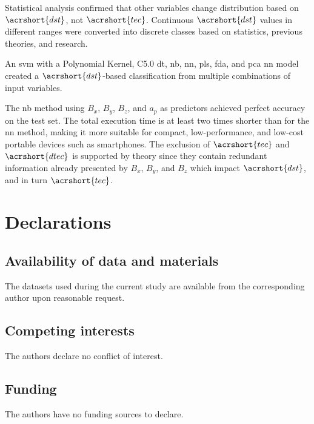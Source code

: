 \let\LaTeXcline\cline\documentclass[sn-mathphys-num]{sn-jnl}\let\cline\LaTeXcline
\begin{document}
Statistical analysis confirmed that other variables change distribution based on $\acrshort{dst}$, not $\acrshort{tec}$. Continuous $\acrshort{dst}$ values in different ranges were converted into discrete classes based on statistics, previous theories, and research. 

An \acrfull{svm} with a Polynomial Kernel, C5.0 \acrfull{dt}, \acrfull{nb}, \acrfull{nn}, \acrfull{pls}, \acrfull{fda}, and \acrfull{pca} \acrshort{nn} model created a $\acrshort{dst}$-based classification from multiple combinations of input variables.

The \acrshort{nb} method using $B_{x}$, $B_{y}$, $B_{z}$, and $a_{p}$ as predictors achieved perfect accuracy on the test set. The total execution time is at least two times shorter than for the \acrshort{nn} method, making it more suitable for compact, low-performance, and low-cost portable devices such as smartphones. The exclusion of $\acrshort{tec}$ and $\acrshort{dtec}$ is supported by theory since they contain redundant information already presented by $B_{x}$, $B_{y}$, and $B_{z}$ which impact $\acrshort{dst}$, and in turn  $\acrshort{tec}$.

\clearpage

\printglossary[type=\acronymtype]

\section{Declarations}

\subsection{Availability of data and materials}

The datasets used during the current study are available from the corresponding author upon reasonable request.

\subsection{Competing interests}

The authors declare no conflict of interest.

\subsection{Funding}

The authors have no funding sources to declare.
\end{document}
